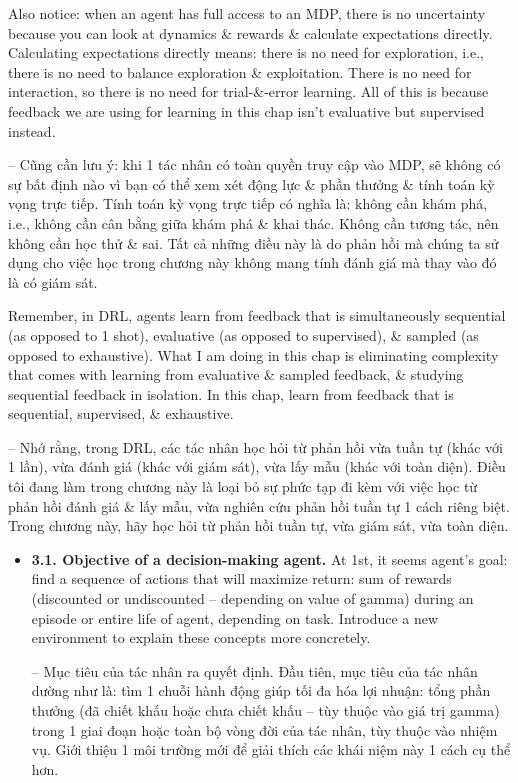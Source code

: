\documentclass{article}
\begin{document}
\begin{itemize}
    Also notice: when an agent has full access to an MDP, there is no uncertainty because you can look at dynamics \& rewards \& calculate expectations directly. Calculating expectations directly means: there is no need for exploration, i.e., there is no need to balance exploration \& exploitation. There is no need for interaction, so there is no need for trial-\&-error learning. All of this is because feedback we are using for learning in this chap isn't evaluative but supervised instead.

    -- Cũng cần lưu ý: khi 1 tác nhân có toàn quyền truy cập vào MDP, sẽ không có sự bất định nào vì bạn có thể xem xét động lực \& phần thưởng \& tính toán kỳ vọng trực tiếp. Tính toán kỳ vọng trực tiếp có nghĩa là: không cần khám phá, i.e., không cần cân bằng giữa khám phá \& khai thác. Không cần tương tác, nên không cần học thử \& sai. Tất cả những điều này là do phản hồi mà chúng ta sử dụng cho việc học trong chương này không mang tính đánh giá mà thay vào đó là có giám sát.

    Remember, in DRL, agents learn from feedback that is simultaneously sequential (as opposed to 1 shot), evaluative (as opposed to supervised), \& sampled (as opposed to exhaustive). What I am doing in this chap is eliminating complexity that comes with learning from evaluative \& sampled feedback, \& studying sequential feedback in isolation. In this chap, learn from feedback that is sequential, supervised, \& exhaustive.

    -- Nhớ rằng, trong DRL, các tác nhân học hỏi từ phản hồi vừa tuần tự (khác với 1 lần), vừa đánh giá (khác với giám sát), vừa lấy mẫu (khác với toàn diện). Điều tôi đang làm trong chương này là loại bỏ sự phức tạp đi kèm với việc học từ phản hồi đánh giá \& lấy mẫu, vừa nghiên cứu phản hồi tuần tự 1 cách riêng biệt. Trong chương này, hãy học hỏi từ phản hồi tuần tự, vừa giám sát, vừa toàn diện.
    \begin{itemize}
        \item {\bf3.1. Objective of a decision-making agent.} At 1st, it seems agent's goal: find a sequence of actions that will maximize return: sum of rewards (discounted or undiscounted -- depending on value of gamma) during an episode or entire life of agent, depending on task. Introduce a new environment to explain these concepts more concretely.

        -- {\sf Mục tiêu của tác nhân ra quyết định.} Đầu tiên, mục tiêu của tác nhân dường như là: tìm 1 chuỗi hành động giúp tối đa hóa lợi nhuận: tổng phần thưởng (đã chiết khấu hoặc chưa chiết khấu -- tùy thuộc vào giá trị gamma) trong 1 giai đoạn hoặc toàn bộ vòng đời của tác nhân, tùy thuộc vào nhiệm vụ. Giới thiệu 1 môi trường mới để giải thích các khái niệm này 1 cách cụ thể hơn.


\end{itemize}
\end{itemize}
\end{document}
